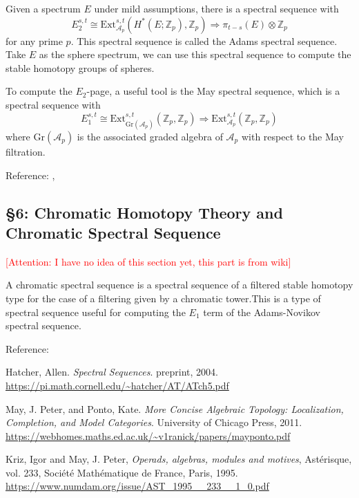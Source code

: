 \documentclass[12pt, reqno]{amsart}
\theoremstyle{definition}
\theoremstyle{remark}
\numberwithin{equation}{section}
\begin{document}
{Given a spectrum $E$ under mild assumptions, there is a spectral sequence with
\[ E_2^{s,t} \cong \mathrm{Ext}^{s,t}_{\mathcal{A}_p}(H^*(E; \mathbb{Z}_p), \mathbb{Z}_p) \Rightarrow \pi_{t-s}(E) \otimes \mathbb{Z}_p \]
for any prime $p$. This spectral sequence is called the Adams spectral sequence. Take $E$ as the sphere spectrum, we can use this spectral sequence to compute the stable homotopy groups of spheres.

To compute the $E_2$-page, a useful tool is the May spectral sequence, which is a spectral sequence with
\[ E_1^{s,t} \cong \mathrm{Ext}^{s,t}_{\mathrm{Gr}(\mathcal{A}_p)}(\mathbb{Z}_p, \mathbb{Z}_p) \Rightarrow \mathrm{Ext}^{s,t}_{\mathcal{A}_p}(\mathbb{Z}_p, \mathbb{Z}_p) \]
where $\mathrm{Gr}(\mathcal{A}_p)$ is the associated graded algebra of $\mathcal{A}_p$ with respect to the May filtration.  

Reference: \cite{HatSS}, \cite{Koc96}

\subsection*{\textbf{§6: Chromatic Homotopy Theory and Chromatic Spectral Sequence}}

\textcolor{red}{[Attention: I have no idea of this section yet, this part is from wiki]}

A chromatic spectral sequence is a spectral sequence of a filtered stable homotopy type for the case of a filtering given by a chromatic tower.This is a type of spectral sequence useful for computing the $E_1$ term of the Adams-Novikov spectral sequence.

Reference: \cite{Rog23}



\begin{thebibliography}{99}
Hatcher, Allen.
\emph{Spectral Sequences}.
preprint, 2004.
\url{https://pi.math.cornell.edu/~hatcher/AT/ATch5.pdf}

May, J. Peter, and Ponto, Kate.
\emph{More Concise Algebraic Topology: Localization, Completion, and Model Categories}.
University of Chicago Press, 2011.
\url{https://webhomes.maths.ed.ac.uk/~v1ranick/papers/mayponto.pdf}

Kriz, Igor and May, J. Peter,
\emph{Operads, algebras, modules and motives},
Ast\'{e}risque, vol. 233,
Soci\'{e}t\'{e} Math\'{e}matique de France, Paris, 1995.
\url{https://www.numdam.org/issue/AST_1995__233__1_0.pdf}


\end{thebibliography}}
\end{document}
